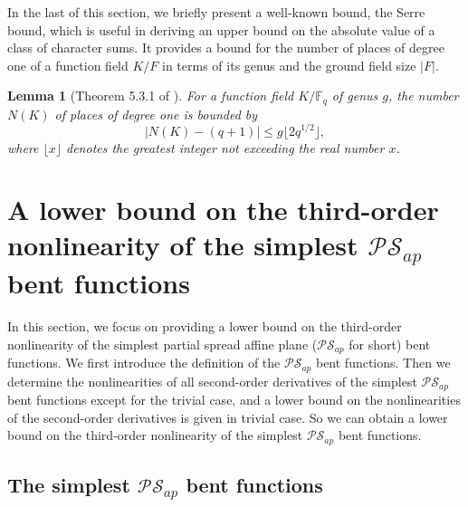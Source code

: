 \documentclass[preprint,10pt]{elsarticle}
\newcommand{\F}{\mathbb{F}}
\newcommand{\0}{\textbf{0}}
\newcommand{\1}{\textbf{1}}
\theoremstyle{plain}
\newtheorem{lemma}{Lemma}
\begin{document}
    In the last of this section, we briefly present a well-known bound, the Serre bound, which is useful in deriving an upper bound on the absolute value of a class of character sums.
    It provides a bound for the number of places of degree one of a function field $K/F$ in terms of its genus and the ground field size $|F|$.
    \begin{lemma}[Theorem 5.3.1 of \cite{Stichtenoth2008book_algebraicfunctionfieldsandcodes}]\label{L:Serrebound}
        For a function field $K/\F_q$ of genus $g$, the number $N(K)$ of places of degree one is bounded by 
        \[\lvert N(K)-(q+1)\rvert\le g\lfloor 2q^{1/2}\rfloor,\]
        where $\lfloor x\rfloor$ denotes the greatest integer not exceeding the real number $x$.
    \end{lemma}


     

\section{A lower bound on the third-order nonlinearity of the simplest $\mathcal{PS}_{ap}$ bent functions}

In this section, we focus on providing a lower bound on the third-order nonlinearity of the simplest
partial spread affine plane ($\mathcal{PS}_{ap}$ for short) bent functions.
We first introduce the definition of the $\mathcal{PS}_{ap}$ bent functions.
Then we determine the nonlinearities of all second-order derivatives of the simplest $\mathcal{PS}_{ap}$ bent functions
except for the trivial case, and a lower bound on the nonlinearities of the second-order derivatives is given in trivial case.
So we can obtain a lower bound on the third-order nonlinearity of the simplest $\mathcal{PS}_{ap}$
bent functions.

  \subsection{The simplest $\mathcal{PS}_{ap}$ bent functions}
\end{document}
